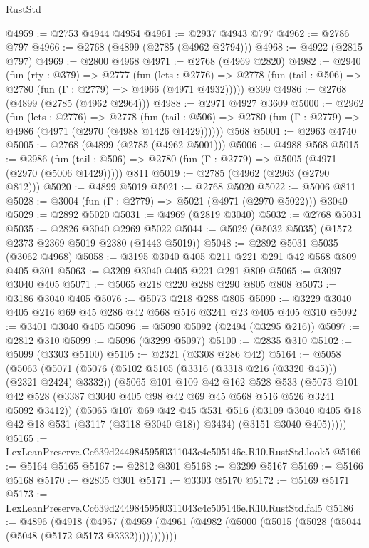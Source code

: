 \begin{lexlean}{RustStd}
\begin{coremodule}
@4959 := @2753 @4944 @4954
@4961 := @2937 @4943 @797
@4962 := @2786 @797
@4966 := @2768 (@4899 (@2785 (@4962 @2794)))
@4968 := @4922 (@2815 @797)
@4969 := @2800 @4968
@4971 := @2768 (@4969 @2820)
@4982 := @2940
    (fun (rty : @379) =>
    @2777
      (fun (lets : @2776) =>
      @2778 (fun (tail : @506) => @2780 (fun (Γ : @2779) => @4966 (@4971 @4932)))))
    @399
@4986 := @2768 (@4899 (@2785 (@4962 @2964)))
@4988 := @2971 @4927 @3609
@5000 := @2962
    (fun (lets : @2776) =>
    @2778
      (fun (tail : @506) => @2780 (fun (Γ : @2779) => @4986 (@4971 (@2970 (@4988 @1426 @1429))))))
    @568
@5001 := @2963 @4740
@5005 := @2768 (@4899 (@2785 (@4962 @5001)))
@5006 := @4988 @568
@5015 := @2986
    (fun (tail : @506) => @2780 (fun (Γ : @2779) => @5005 (@4971 (@2970 (@5006 @1429)))))
    @811
@5019 := @2785 (@4962 (@2963 (@2790 @812)))
@5020 := @4899 @5019
@5021 := @2768 @5020
@5022 := @5006 @811
@5028 := @3004 (fun (Γ : @2779) => @5021 (@4971 (@2970 @5022))) @3040
@5029 := @2892 @5020
@5031 := @4969 (@2819 @3040)
@5032 := @2768 @5031
@5035 := @2826 @3040 @2969 @5022
@5044 := @5029 (@5032 @5035) (@1572 @2373 @2369 @5019 @2380 (@1443 @5019))
@5048 := @2892 @5031 @5035 (@3062 @4968)
@5058 := @3195 @3040 @405 @211 @221 @291 @42 @568 @809 @405 @301
@5063 := @3209 @3040 @405 @221 @291 @809
@5065 := @3097 @3040 @405
@5071 := @5065 @218 @220 @288 @290 @805 @808
@5073 := @3186 @3040 @405
@5076 := @5073 @218 @288 @805
@5090 := @3229 @3040 @405 @216 @69 @45 @286 @42 @568 @516 @3241 @23 @405 @405 @310
@5092 := @3401 @3040 @405
@5096 := @5090 @5092 (@2494 (@3295 @216))
@5097 := @2812 @310
@5099 := @5096 (@3299 @5097)
@5100 := @2835 @310
@5102 := @5099 (@3303 @5100)
@5105 := @2321 (@3308 @286 @42)
@5164 := @5058
    (@5063
      (@5071
        (@5076 (@5102 @5105 (@3316 (@3318 @216 (@3320 @45))) (@2321 @2424) @3332))
        (@5065
          @101
          @109
          @42
          @162
          @528
          @533
          (@5073 @101 @42 @528 (@3387 @3040 @405 @98 @42 @69 @45 @568 @516 @526 @3241 @5092 @3412))
          (@5065
            @107
            @69
            @42
            @45
            @531
            @516
            (@3109 @3040 @405 @18 @42 @18 @531 (@3117 (@3118 @3040 @18)) @3434)
            (@3151 @3040 @405)))))
@5165 := LexLeanPreserve.Cc639d244984595f0311043c4c505146e.R10.RustStd.look5
@5166 := @5164 @5165
@5167 := @2812 @301
@5168 := @3299 @5167
@5169 := @5166 @5168
@5170 := @2835 @301
@5171 := @3303 @5170
@5172 := @5169 @5171
@5173 := LexLeanPreserve.Cc639d244984595f0311043c4c505146e.R10.RustStd.fal5
@5186 := @4896
    (@4918
      (@4957 (@4959 (@4961 (@4982 (@5000 (@5015 (@5028 (@5044 (@5048 (@5172 @5173 @3332)))))))))))

\end{coremodule}
\end{lexlean}
